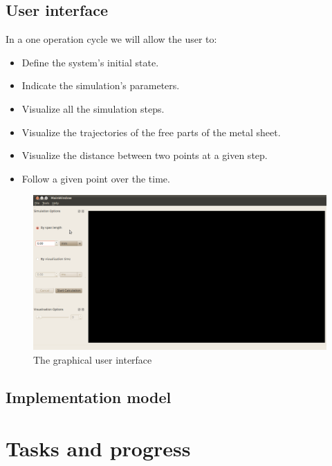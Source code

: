 \documentclass{beamer}
\begin{document}
\subsection{User interface}
\begin{frame}
    In a one operation cycle we will allow the user to:
    \begin{itemize}
        \item Define the system's initial state.
        \item Indicate the simulation's parameters.
        \item Visualize all the simulation steps.
        \item Visualize the trajectories of the free parts of the metal sheet.
        \item Visualize the distance between two points at a given step.
        \item Follow a given point over the time.
    \end{itemize}
\end{frame}
\begin{frame}
    \begin{figure}
        \includegraphics[width=\textwidth]{img/interface.png}
        \caption{The graphical user interface}
    \end{figure}
\end{frame}
\subsection{Implementation model}
\section{Tasks and progress}
\end{document}
